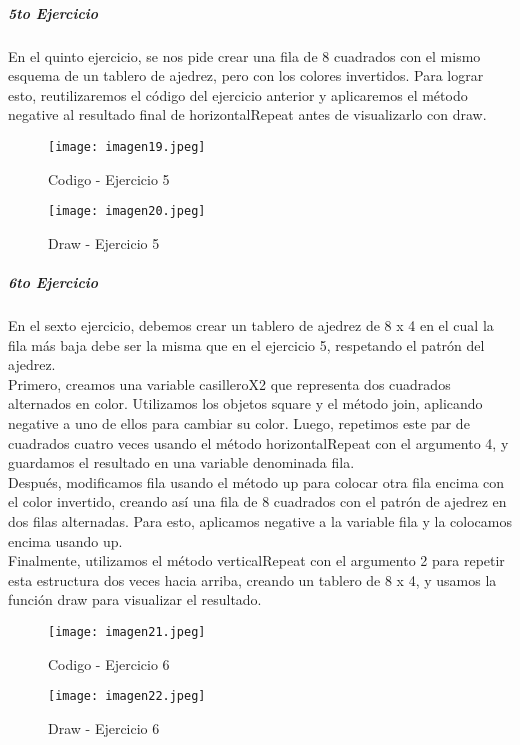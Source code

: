 \documentclass[10pt, a4paper]{article}
\begin{document}
	\subparagraph*{5to Ejercicio}
		\begin{flushleft}
			En el quinto ejercicio, se nos pide crear una fila de 8 cuadrados con el mismo esquema de un tablero de ajedrez, pero con los colores invertidos. Para lograr esto, reutilizaremos el código del ejercicio anterior y aplicaremos el método negative al resultado final de horizontalRepeat antes de visualizarlo con draw.
		\end{flushleft}
		\begin{figure}[h]
			\centering
			\texttt{[image: imagen19.jpeg]}
			\caption{Codigo - Ejercicio 5}
		\end{figure}
		\begin{figure}[h]
			\centering
			\texttt{[image: imagen20.jpeg]}
			\caption{Draw - Ejercicio 5}
		\end{figure} 
		\vspace*{13cm}
	\subparagraph*{6to Ejercicio}
		\begin{flushleft}
			En el sexto ejercicio, debemos crear un tablero de ajedrez de 8 x 4 en el cual la fila más baja debe ser la misma que en el ejercicio 5, respetando el patrón del ajedrez.\\
			Primero, creamos una variable casilleroX2 que representa dos cuadrados alternados en color. Utilizamos los objetos square y el método join, aplicando negative a uno de ellos para cambiar su color. Luego, repetimos este par de cuadrados cuatro veces usando el método horizontalRepeat con el argumento 4, y guardamos el resultado en una variable denominada fila.\\
			Después, modificamos fila usando el método up para colocar otra fila encima con el color invertido, creando así una fila de 8 cuadrados con el patrón de ajedrez en dos filas alternadas. Para esto, aplicamos negative a la variable fila y la colocamos encima usando up.\\			
			Finalmente, utilizamos el método verticalRepeat con el argumento 2 para repetir esta estructura dos veces hacia arriba, creando un tablero de 8 x 4, y usamos la función draw para visualizar el resultado.
		\end{flushleft}
		\begin{figure}[h]
			\centering
			\texttt{[image: imagen21.jpeg]}
			\caption{Codigo - Ejercicio 6}
		\end{figure}
		\begin{figure}[h]
			\centering
			\texttt{[image: imagen22.jpeg]}
			\caption{Draw - Ejercicio 6}
		\end{figure} 
\end{document}
